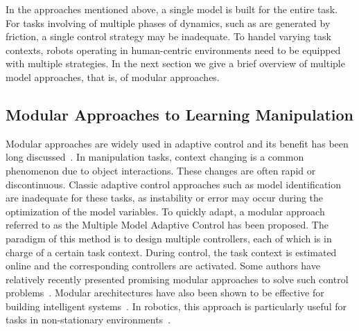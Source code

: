 
In the approaches mentioned above, a single model is built for the
entire task. For tasks involving of multiple phases of dynamics, such
as are generated by friction, a single control strategy may be inadequate. To handel
varying task contexts, robots operating in human-centric environments
need to be equipped with multiple strategies. In the next section we
give a brief overview of  multiple model approaches, that is, of modular approaches.


\subsection{Modular Approaches to Learning Manipulation}


Modular approaches are widely used in adaptive control and its benefit has been long discussed~\citep{athans1977stochastic,jacobs1991adaptive,narendra1995adaptation,narendra1997adaptive}.
In manipulation tasks, context changing is a common phenomenon due to object interactions. These changes are often rapid or discontinuous. Classic adaptive control approaches such as model
identification~\citep{khalil2004modeling} are inadequate for these
tasks, as instability or error may occur during the optimization of
the model variables. To quickly adapt, a modular approach referred to as
the Multiple Model Adaptive Control
\citep[MMAC, ][]{athans1977stochastic} has been proposed. The paradigm of this method is to design multiple controllers, each of which is in charge of a certain task
context. During control, the task context is estimated online and the
corresponding controllers are activated. Some authors have relatively
recently presented promising modular approaches to solve such control problems~\citep{fekri2007robust,kuipers2010multiple}. Modular arechitectures have also been shown to be effective for building intelligent systems~\citep{mobile98,BrysonJETAI00,BrysonIJCAI01}. In robotics,
this approach is particularly useful for tasks in non-stationary
environments~\citep{sugimoto2012emosaic}.

